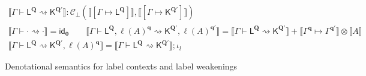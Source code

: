 \documentclass[acmsmall,screen,review]{acmart}
\newcommand{\mc}[1]{\ensuremath{\mathcal{#1}}}
\newcommand{\mb}[1]{\ensuremath{\mathbf{#1}}}
\newcommand{\ms}[1]{\ensuremath{\mathsf{#1}}}
\newcommand{\cwk}[2]{#1 \mapsto #2}
\newcommand{\lwk}[3]{#1 \vdash #2 \rightsquigarrow #3}
\newcommand{\lhyp}[2]{#1(#2)}
\newcommand{\ltoty}[2]{[#1 \mapsto #2]}
\newcommand{\dnt}[1]{\llbracket{#1}\rrbracket}
\begin{document}
\begin{figure}
  \begin{adjustbox}{minipage=1.1\textwidth,scale=0.9}
  \begin{gather*}
    \boxed{\dnt{\lwk{\Gamma}{\ms{L}^{\mb{Q}}}{\ms{K}^{\mb{Q}'}}} 
      : \mc{C}_\bot(\dnt{\ltoty{\Gamma}{\ms{L}^{\mb{Q}}}}, 
                    \dnt{\ltoty{\Gamma}{\ms{K}^{\mb{Q}'}}})} \\
    \dnt{\lwk{\Gamma}{\cdot}{\cdot}} = \ms{id}_{\mb{0}} \qquad
    \dnt
      {\lwk{\Gamma}{\ms{L}^{\mb{Q}}, \lhyp{\ell}{A}^{\mb{q}}}
      {\ms{K}^{\mb{Q}'}, \lhyp{\ell}{A}^{\mb{q}'}}}
    = \dnt{\lwk{\Gamma}{\ms{L}^{\mb{Q}}}{\ms{K}^{\mb{Q}'}}} 
      + \dnt{\cwk{\Gamma^{\mb{q}}}{\Gamma^{\mb{q}'}}} \otimes \dnt{A} \\
    \dnt
      {\lwk{\Gamma}{\ms{L}^{\mb{Q}}}
      {\ms{K}^{\mb{Q}'}, \lhyp{\ell}{A}^{\mb{q}}}}
    = \dnt{\lwk{\Gamma}{\ms{L}^{\mb{Q}}}{\ms{K}^{\mb{Q}'}}} ; \iota_l
  \end{gather*}
  \end{adjustbox}
  \caption{Denotational semantics for label contexts and label weakenings}
  \Description{}
  \label{fig:lwk-densem}
\end{figure}
\end{document}
